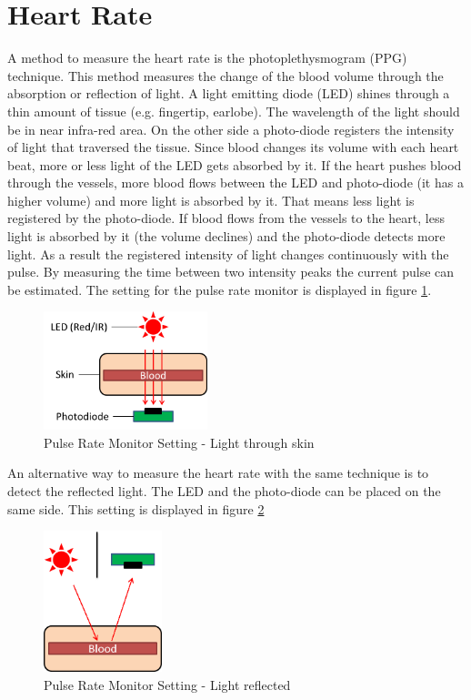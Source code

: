 \documentclass[notitlepage]{scrreprt}
\begin{document}
\section{Heart Rate}
A method to measure the heart rate is the photoplethysmogram (PPG) technique. This method measures the change of the blood volume through the absorption or reflection of light. A light emitting diode (LED) shines through a thin amount of tissue (e.g. fingertip, earlobe). The wavelength of the light should be in near infra-red area. On the other side a photo-diode registers the intensity of light that traversed the tissue. Since blood changes its volume with each heart beat, more or less light of the LED gets absorbed by it. If the heart pushes blood through the vessels, more blood flows between the LED and photo-diode (it has a higher volume) and more light is absorbed by it. That means less light is registered by the photo-diode. If blood flows from the vessels to the heart, less light is absorbed by it (the volume declines) and the photo-diode detects more light. As a result the registered intensity of light changes continuously with the pulse. By measuring the time between two intensity peaks the current pulse can be estimated. The setting for the pulse rate monitor is displayed in figure \ref{fig:pulse-rate-monitor-setting}.

\begin{figure}[H]
	\centering
	\includegraphics[width=180px]{images/pulse-rate-aufbau.png}
	\caption{Pulse Rate Monitor Setting - Light through skin}
	\label{fig:pulse-rate-monitor-setting}
\end{figure}

\newpage

An alternative way to measure the heart rate with the same technique is to detect the reflected light. The LED and the photo-diode can be placed on the same side. This setting is displayed in figure \ref{fig:pulse-rate-monitor-setting2}

\begin{figure}[H]
	\centering
	\includegraphics[width=130px]{images/pulse-rate-aufbau2.png}
	\caption{Pulse Rate Monitor Setting - Light reflected}
	\label{fig:pulse-rate-monitor-setting2}
\end{figure}
\end{document}

